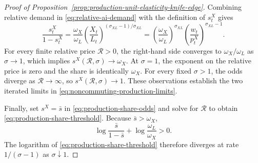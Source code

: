 \begin{proof}[Proof of Proposition~\ref{prop:production-unit-elasticity-knife-edge}]
Combining relative demand in \eqref{eq:relative-ai-demand} with the definition of
$s^X_t$ gives
\[
    \frac{s^X_t}{1-s^X_t}
    =
    \frac{\omega_X}{\omega_L}
    \left(\frac{X_t}{L_t}\right)^{(\sigma_{XL}-1)/\sigma_{XL}}
    =
    \left(\frac{\omega_X}{\omega_L}\right)^{\sigma_{XL}}
    \left(\frac{w_t}{p^X_t}\right)^{\sigma_{XL}-1}.
\]
For every finite relative price $\mathcal R>0$, the right-hand side converges to
$\omega_X/\omega_L$ as $\sigma\to1$, which implies
$s^X(\mathcal R,\sigma)\to\omega_X$. At $\sigma=1$, the exponent on the relative
price is zero and the share is identically $\omega_X$. For every fixed $\sigma>1$,
the odds diverge as $\mathcal R\to\infty$, so
$s^X(\mathcal R,\sigma)\to1$. These observations establish the two
iterated limits in \eqref{eq:noncommuting-production-limits}.

Finally, set $s^X=\bar s$ in \eqref{eq:production-share-odds} and solve for
$\mathcal R$ to obtain \eqref{eq:production-share-threshold}. Because
$\bar s>\omega_X$,
\[
    \log\frac{\bar s}{1-\bar s}
    +\log\frac{\omega_L}{\omega_X}>0.
\]
The logarithm of \eqref{eq:production-share-threshold} therefore diverges at rate
$1/(\sigma-1)$ as $\sigma\downarrow1$.
\end{proof}

